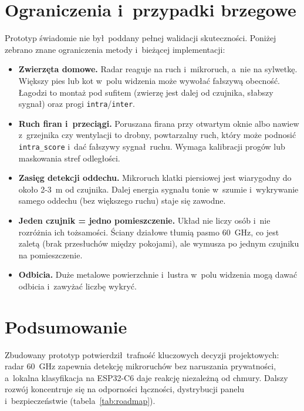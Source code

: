 \documentclass[11pt,a4paper]{article}
\begin{document}
\section{Ograniczenia i~przypadki brzegowe}

Prototyp \'swiadomie nie by\l\ poddany pe\l nej walidacji skuteczno\'sci. Poni\.zej
zebrano znane ograniczenia metody i~bie\.z\k acej implementacji:

\begin{itemize}[leftmargin=1.4em]
  \item \textbf{Zwierz\k eta domowe.} Radar reaguje na ruch i~mikroruch, a~nie na
        sylwetk\k e. Wi\k ekszy pies lub kot w~polu widzenia mo\.ze wywo\l a\'c
        fa\l szyw\k a obecno\'s\'c. \L agodzi to monta\.z pod sufitem (zwierz\k e jest
        dalej od czujnika, s\l abszy sygna\l) oraz progi \texttt{intra}/\texttt{inter}.
  \item \textbf{Ruch firan i~przeci\k agi.} Poruszana firana przy otwartym oknie
        albo nawiew z~grzejnika czy wentylacji to drobny, powtarzalny ruch, kt\'ory
        mo\.ze podnosi\'c \texttt{intra\_score} i~da\'c fa\l szywy sygna\l\ ruchu.
        Wymaga kalibracji prog\'ow lub maskowania stref odleg\l o\'sci.
  \item \textbf{Zasi\k eg detekcji oddechu.} Mikroruch klatki piersiowej jest
        wiarygodny do oko\l o 2-3~m od czujnika. Dalej energia sygna\l u tonie
        w~szumie i~wykrywanie samego oddechu (bez wi\k ekszego ruchu) staje si\k e
        zawodne.
  \item \textbf{Jeden czujnik = jedno pomieszczenie.} Uk\l ad nie liczy os\'ob
        i~nie rozr\'o\.znia ich to\.zsamo\'sci. \'Sciany dzia\l owe t\l umi\k a
        pasmo 60~GHz, co jest zalet\k a (brak przes\l uch\'ow mi\k edzy pokojami), ale
        wymusza po jednym czujniku na pomieszczenie.
  \item \textbf{Odbicia.} Du\.ze metalowe powierzchnie i~lustra w~polu widzenia
        mog\k a dawa\'c odbicia i~zawy\.za\'c liczb\k e wykry\'c.
\end{itemize}

\section{Podsumowanie}

Zbudowany prototyp potwierdzi\l\ trafno\'s\'c kluczowych decyzji projektowych: radar
60~GHz zapewnia detekcj\k e mikroruch\'ow bez naruszania prywatno\'sci, a~lokalna
klasyfikacja na ESP32-C6 daje reakcj\k e niezale\.zn\k a od chmury. Dalszy rozw\'oj
koncentruje si\k e na odporno\'sci \l \k aczno\'sci, dystrybucji panelu
i~bezpiecze\'nstwie (tabela~\ref{tab:roadmap}).
\end{document}
